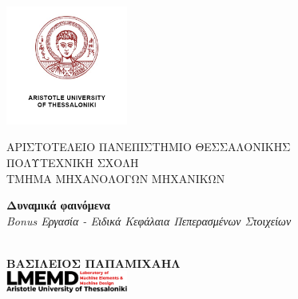 \newcommand{\uni}{ΑΡΙΣΤΟΤΕΛΕΙΟ ΠΑΝΕΠΙΣΤΗΜΙΟ ΘΕΣΣΑΛΟΝΙΚΗΣ}
\newcommand{\faculty}{ΠΟΛΥΤΕΧΝΙΚΗ ΣΧΟΛΗ}
\newcommand{\tmhma}{ΤΜΗΜΑ ΜΗΧΑΝΟΛΟΓΩΝ ΜΗΧΑΝΙΚΩΝ}


\newcommand{\titlos}{Δυναμικά φαινόμενα}
\newcommand{\ypotitlos}{Bonus Εργασία - Ειδικά Κεφάλαια Πεπερασμένων Στοιχείων}


\newcommand{\onomaauthor}{ΒΑΣΙΛΕΙΟΣ ΠΑΠΑΜΙΧΑΗΛ}


\newcommand{\advisor}{Γάκιας Χρήστος}
\newcommand{\mailauthor}{\href{mailto:vasilepi@meng.auth.gr}{vasilepi@meng.auth.gr}}
\newcommand{\aem}{6920}
\newcommand{\hmeromhnia}{\today}



\begin{titlepage}
    \begin{center}
    \includegraphics[width=4cm]{media/autheng.jpg}
     \end{center}
    
    \begin{center}
        \large
        \uni\\
        \normalsize
        \faculty\\
        \vspace{1em}
        \tmhma
    \end{center}

    \vspace{2cm}
    \begin{center}
        \Large
        \textbf{\titlos}\\
        \vspace{1em}
        \large
        \textit{\ypotitlos}
    \end{center}
    \begin{center}
        \\
    \vspace{7em}
    \Large
    \textcolor{BrickRed}{\textbf{\onomaauthor}}\\
    \vspace{3em}
    \includegraphics[width=0.3\textwidth]{media/newlogov3-cropped-content.png}
    \end{center}


\end{titlepage}
